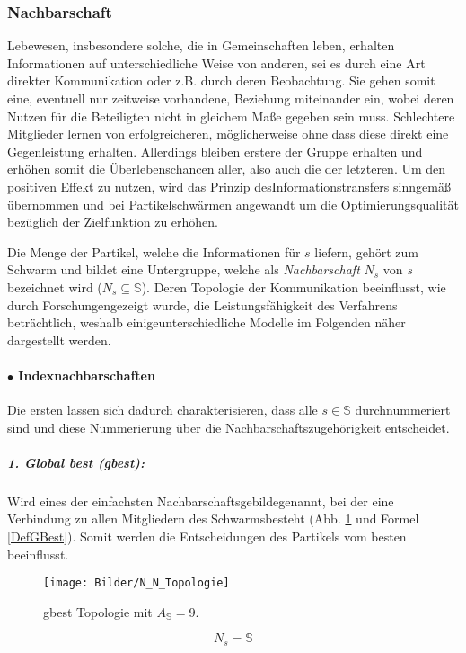 \subsubsection{Nachbarschaft}
  Lebewesen, insbesondere solche, die in Gemeinschaften leben, erhalten Informationen auf unterschiedliche Weise von anderen, sei es durch eine Art direkter Kommunikation oder z.B. durch deren Beobachtung. Sie gehen somit eine, eventuell nur zeitweise vorhandene, Beziehung miteinander ein, wobei deren Nutzen für die Beteiligten nicht in gleichem Maße gegeben sein muss. Schlechtere Mitglieder lernen von erfolgreicheren, möglicherweise ohne dass diese direkt eine Gegenleistung erhalten. Allerdings bleiben erstere der Gruppe erhalten und erhöhen somit die Überlebenschancen aller, also auch die der letzteren. Um den positiven Effekt zu nutzen, wird das Prinzip des\linebreak Informationstransfers sinngemäß übernommen und bei Partikelschwärmen angewandt um die Optimierungsqualität bezüglich der Zielfunktion zu erhöhen. \cite{Eberhart2001}
 
  Die Menge der Partikel, welche die Informationen für $s$ liefern, gehört zum Schwarm und bildet eine Untergruppe, welche als \textit{Nachbarschaft} $N_s$ von $s$ bezeichnet wird ($N_s\subseteq \mathbb{S}$). Deren Topologie der Kommunikation beeinflusst, wie durch Forschungen\linebreak gezeigt wurde, die Leistungsfähigkeit des Verfahrens beträchtlich, weshalb einige\linebreak unterschiedliche Modelle im Folgenden näher dargestellt werden. \cite{Eberhart2001, Huang2005}

\paragraph{$\bullet$ Indexnachbarschaften}
  Die ersten lassen sich dadurch charakterisieren, dass alle $s\in\mathbb{S}$ durchnummeriert sind und diese Nummerierung über die Nachbarschaftszugehörigkeit entscheidet. 

\subparagraph{1. Global best (gbest):}
  Wird eines der einfachsten Nachbarschaftsgebilde\linebreak genannt, bei der eine Verbindung zu allen Mitgliedern des Schwarms\linebreak besteht (Abb. \ref{Topologie_Alle} und Formel \ref{DefGBest}). Somit werden die Entscheidungen des Partikels vom besten beeinflusst. \cite{Huang2005, Eberhart2001}
  \begin{figure}[!t]
    \centering
    \texttt{[image: Bilder/N\_N\_Topologie]}
    \caption{gbest Topologie mit $A_\mathbb{S} = 9$.}
    \label{Topologie_Alle}
  \end{figure}
  \begin{equation}\label{DefGBest}
    N_s = \mathbb{S}
  \end{equation}

